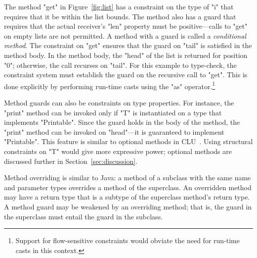 
The method \xcd"get" in Figure~\ref{fig:list}
has a constraint on the type of \xcd"i" that requires
that it be within the list bounds.
The method also has a guard that
requires that the actual
receiver's
\xcd"len" property must be positive---calls to \xcd"get" on empty
lists are not permitted.
A method with a guard is called a \emph{conditional method}.
The constraint on \xcd"get" ensures that the guard on 
\xcd"tail" is satisfied in the method body.
In the method body, the \xcd"head" of the list is returned for
position \xcd"0"; otherwise, the call recurses on \xcd"tail".
For this example to type-check, the constraint system
must establish
the guard on the recursive call to \xcd"get".
This is done explicitly by performing run-time casts using the
\xcd"as" operator.\footnote{Support for flow-sensitive constraints
would obviate the need for
run-time casts in this context.}

Method guards can also be constraints on type properties.
For instance, the \xcd"print" method can be invoked only if
\xcd"T" is instantiated on a type that implements
\xcd"Printable".  Since the guard holds in the body of the
method, the \xcd"print" method can be invoked on \xcd"head"---it
is guaranteed to implement \xcd"Printable".
This feature is similar to optional methods in CLU~\cite{clu}.
Using structural constraints on \xcd"T" would give more
expressive power; optional methods are discussed further in
Section~\ref{sec:discussion}.

Method overriding is similar to Java: a method of a subclass
with the same name and parameter types overrides a method of the
superclass.  An overridden method may have a return type that is
a subtype of the superclass method's return type.
A method guard may be weakened by an overriding
method; that is, the guard in the superclass must entail the  
guard in the subclass.

